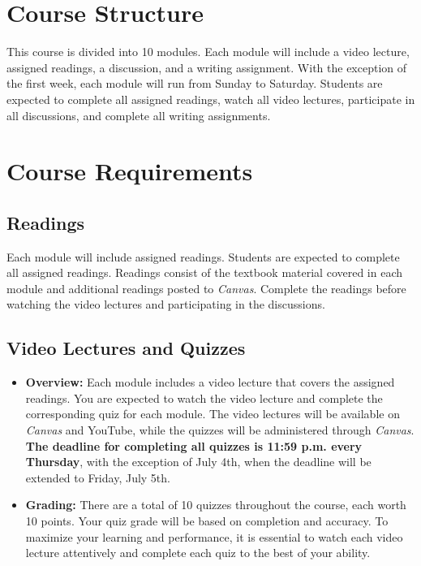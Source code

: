 \documentclass[11pt, letterpaper]{article}
\begin{document}
\section{Course Structure}

This course is divided into 10 modules. Each module will include a video lecture, assigned readings, a discussion, and a writing assignment. With the exception of the first week, each module will run from Sunday to Saturday. Students are expected to complete all assigned readings, watch all video lectures, participate in all discussions, and complete all writing assignments.

\section*{Course Requirements}

\subsection*{Readings}

Each module will include assigned readings. Students are expected to complete all assigned readings. Readings consist of the textbook material covered in each module and additional readings posted to \emph{Canvas}. Complete the readings before watching the video lectures and participating in the discussions.

\subsection*{Video Lectures and Quizzes}
\begin{itemize}
    \item \textbf{Overview:} Each module includes a video lecture that covers the assigned readings. You are expected to watch the video lecture and complete the corresponding quiz for each module. The video lectures will be available on \emph{Canvas} and YouTube, while the quizzes will be administered through \emph{Canvas}. \textbf{The deadline for completing all quizzes is 11:59 p.m. every Thursday}, with the exception of July 4th, when the deadline will be extended to Friday, July 5th.
    \item \textbf{Grading:} There are a total of 10 quizzes throughout the course, each worth 10 points. Your quiz grade will be based on completion and accuracy. To maximize your learning and performance, it is essential to watch each video lecture attentively and complete each quiz to the best of your ability.
\end{itemize}
\end{document}
